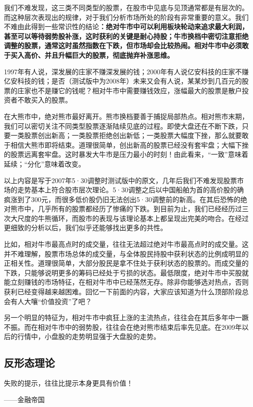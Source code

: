 我们不难发现，这三类不同类型的股票，在股市中见底与见顶通常都是有层次的。而这种层次表现出的规律，对于我们分析市场所处的阶段有非常重要的意义。我们不难由此得到一些常识性的结论\textbf{：绝对牛市中可以利用板块轮动来追求最大利润，甚至可以等待弱势股补涨，这时获利的关键是耐心持股；牛市换档中密切注意拒绝调整的股票，通常这时虽然指数在下跌，但市场却会比较热闹。相对牛市中必须敢于买入高价、并且升幅巨大的股票，彻底抛弃补涨思维。}

1997年有人说，深发展的庄家不赚深发展的钱；2000年有人说亿安科技的庄家不赚亿安科技的钱；是否（测试版中为2008年）未来又会有人说，某某炒到几百元的股票的庄家也不是赚它的钱呢？相对牛市中需要赚钱效应，涨幅最大的股票是散户投资者不敢买入的股票。

在大熊市中，绝对熊市最好离开。熊市换档要善于捕捉局部热点。相对熊市末期，我们可以密切关注不同类型股票逐渐陆续见底的过程。即使大盘还在不断下跌，只要一类股票创出新高；一类股票拒绝创出新低；一类股票大幅度下挫，那么就要敢于相信大熊市即将结束。道理很简单，创出新高的股票已经没有套牢盘；大幅下挫的股票远离套牢盘。这时暴发大牛市是压力最小的时刻！由此看来，“一致”意味着延续；“分化”意味着改变。

以上内容是写于2007年5·30调整时测试版中的原文，几年后我们不难发现股票市场的走势基本上符合股市层次理论。5·30调整之后以中国船舶为首的高价股的确疯涨到了300元，而很多低价股仍旧无法创出5·30调整前的新高。在其后恐怖的绝对熊市中，几乎所有的股票都经历了惨痛的下跌。到目前为止，我们已经经历过三次大尺度的牛熊循环，而股市的表现与该理论基本上都呈现出完美的吻合。在经过更细致的分析以后，我们似乎还能够找出更多的共性。

比如，相对牛市最高点时的成交量，往往无法超过绝对牛市最高点时的成交量。这并不难理解，股票市场总体的成交量，与全体股民持股中获利状态的比例成明显的正相关性。道理很简单，大部分股民是拿不住处于获利状态的股票的。而成交量的下跌，只能够说明更多的筹码已经处于亏损的状态。最低限度，绝对牛市中买股就能立刻赚钱的市场特征，在相对牛市中已经荡然无存。除非你能够选对热点，否则获利已经变得越来越困难。回忆一下前面的内容，大家应该知道为什么顶部阶段总会有人大嚷“价值投资”了吧？

另一个明显的特征为，相对牛市中疯狂上涨的主流热点，往往会在其后多年中一蹶不振。而在相对牛市中的弱势股，往往会在绝对熊市结束后率先见底。在2009年以后的行情中，小盘股的走势明显强于大盘股的走势。

\subsection{反形态理论}

{\kaishu
失败的提示，往往比提示本身更具有价值！

\hfill ——金融帝国
}

